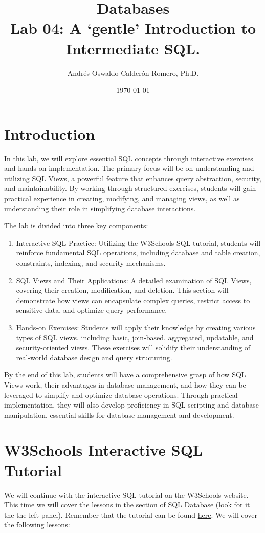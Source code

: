 \documentclass{article}
\title{Databases \\ Lab 04: A `gentle' Introduction to Intermediate SQL.}
\author{Andrés Oswaldo Calderón Romero, Ph.D.}
\date{\today}
\begin{document}
\maketitle

\section{Introduction}
In this lab, we will explore essential SQL concepts through interactive exercises and hands-on implementation. The primary focus will be on understanding and utilizing SQL Views, a powerful feature that enhances query abstraction, security, and maintainability. By working through structured exercises, students will gain practical experience in creating, modifying, and managing views, as well as understanding their role in simplifying database interactions.

The lab is divided into three key components:

\begin{enumerate}
  \item Interactive SQL Practice: Utilizing the W3Schools SQL tutorial, students will reinforce fundamental SQL operations, including database and table creation, constraints, indexing, and security mechanisms.
  \item SQL Views and Their Applications: A detailed examination of SQL Views, covering their creation, modification, and deletion. This section will demonstrate how views can encapsulate complex queries, restrict access to sensitive data, and optimize query performance.
  \item Hands-on Exercises: Students will apply their knowledge by creating various types of SQL views, including basic, join-based, aggregated, updatable, and security-oriented views. These exercises will solidify their understanding of real-world database design and query structuring.

\end{enumerate}

By the end of this lab, students will have a comprehensive grasp of how SQL Views work, their advantages in database management, and how they can be leveraged to simplify and optimize database operations. Through practical implementation, they will also develop proficiency in SQL scripting and database manipulation, essential skills for database management and development.

\section{W3Schools Interactive SQL Tutorial}
We will continue with the interactive SQL tutorial on the W3Schools website.  This time we will cover the lessons in the section of SQL Database (look for it the the left panel). Remember that the tutorial can be found \href{https://www.w3schools.com/sql/}{here}. We will cover the following lessons:
\end{document}
